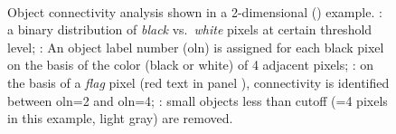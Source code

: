 \def\scale{0.5}
\begin{figure}
	\centering
	\noindent\makebox[\textwidth]{%
		\subfloat[]{%
			\label{subfig:tsuda-03a}%
		}%
		\subfloat[]{%
			\label{subfig:tsuda-03b}%
		}%
	}\\%
	\noindent\makebox[\textwidth]{%
		\subfloat[]{%
			\label{subfig:tsuda-03c}%
		}%
		\subfloat[]{%
			\label{subfig:tsuda-03d}%
		}%
	}%
	\caption[Object connectivity analysis]{Object connectivity analysis shown in a 2-dimensional (\twod) example. : a binary distribution of \emph{black} vs.\ \emph{white} pixels at certain threshold level; : An object label number (\acs{oln}) is assigned for each black pixel on the basis of the color (black or white) of 4 adjacent pixels; : on the basis of a \emph{flag} pixel (red text in panel ), connectivity is identified between \ac{oln}=2 and \ac{oln}=4; : small objects less than cutoff (=4 pixels in this example, light gray) are removed.}
	\label{fig:tsuda-03}
\end{figure}


